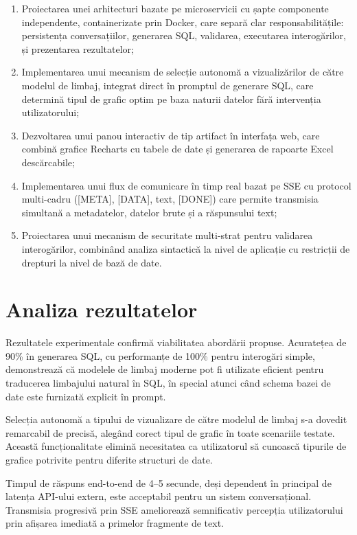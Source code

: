 \documentclass[12pt, a4paper]{report}
\begin{document}
\begin{enumerate}[nosep]
  \item Proiectarea unei arhitecturi bazate pe microservicii cu șapte componente independente, containerizate prin Docker, care separă clar responsabilitățile: persistența conversațiilor, generarea SQL, validarea, executarea interogărilor, și prezentarea rezultatelor;
  \item Implementarea unui mecanism de selecție autonomă a vizualizărilor de către modelul de limbaj, integrat direct în promptul de generare SQL, care determină tipul de grafic optim pe baza naturii datelor fără intervenția utilizatorului;
  \item Dezvoltarea unui panou interactiv de tip artifact în interfața web, care combină grafice Recharts cu tabele de date și generarea de rapoarte Excel descărcabile;
  \item Implementarea unui flux de comunicare în timp real bazat pe SSE cu protocol multi-cadru ([META], [DATA], text, [DONE]) care permite transmisia simultană a metadatelor, datelor brute și a răspunsului text;
  \item Proiectarea unui mecanism de securitate multi-strat pentru validarea interogărilor, combinând analiza sintactică la nivel de aplicație cu restricții de drepturi la nivel de bază de date.
\end{enumerate}

\section{Analiza rezultatelor}

Rezultatele experimentale confirmă viabilitatea abordării propuse. Acuratețea de 90\% în generarea SQL, cu performanțe de 100\% pentru interogări simple, demonstrează că modelele de limbaj moderne pot fi utilizate eficient pentru traducerea limbajului natural în SQL, în special atunci când schema bazei de date este furnizată explicit în prompt.

Selecția autonomă a tipului de vizualizare de către modelul de limbaj s-a dovedit remarcabil de precisă, alegând corect tipul de grafic în toate scenariile testate. Această funcționalitate elimină necesitatea ca utilizatorul să cunoască tipurile de grafice potrivite pentru diferite structuri de date.

Timpul de răspuns end-to-end de 4--5 secunde, deși dependent în principal de latența API-ului extern, este acceptabil pentru un sistem conversațional. Transmisia progresivă prin SSE ameliorează semnificativ percepția utilizatorului prin afișarea imediată a primelor fragmente de text.
\end{document}
